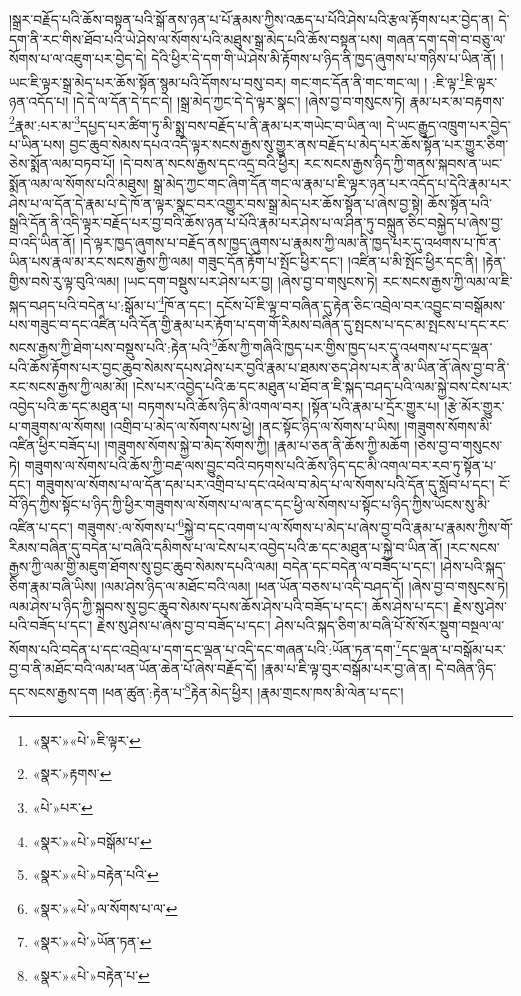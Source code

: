 །སྒྲར་བརྗོད་པའི་ཆོས་བསྟན་པའི་སྒོ་ནས་ཉན་པ་པོ་རྣམས་ཀྱིས་འཆད་པ་པོའི་ཤེས་པའི་རྩལ་རྟོགས་པར་བྱེད་ན། དེ་དག་ནི་རང་གིས་ཐོབ་པའི་ཡེ་ཤེས་ལ་སོགས་པའི་མཐུས་སྒྲ་མེད་པའི་ཆོས་བསྟན་པས། གཞན་དག་དགེ་བ་བཅུ་ལ་སོགས་པ་ལ་འཇུག་པར་བྱེད་དེ། དེའི་ཕྱིར་དེ་དག་གི་ཡེ་ཤེས་མི་རྟོགས་པ་ཉིད་ནི་ཁྱད་ཞུགས་པ་གཉིས་པ་ཡིན་ནོ། །ཡང་ཇི་ལྟར་སྒྲ་མེད་པར་ཆོས་སྟོན་སྙམ་པའི་དོགས་པ་བསུ་བར། གང་གང་དོན་ནི་གང་གང་ལ། །
:ཇི་ལྟ་\footnote{«སྣར་»«པེ་»ཇི་ལྟར་}ཇི་ལྟར་ཉན་འདོད་པ། །དེ་དེ་ལ་དོན་དེ་དང་དེ། །སྒྲ་མེད་ཀྱང་དེ་དེ་ལྟར་སྣང་། །ཞེས་བྱ་བ་གསུངས་ཏེ། རྣམ་པར་མ་བརྟགས་\footnote{«སྣར་»རྟགས་}རྣམ་:པར་མ་\footnote{«པེ་»པར་}དཔྱད་པར་ཚིག་ཏུ་མི་སྨྲ་བས་བརྗོད་པ་ནི་རྣམ་པར་གཡེང་བ་ཡིན་ལ། དེ་ཡང་རྒྱུད་འཁྲུག་པར་བྱེད་པ་ཡིན་པས། བྱང་ཆུབ་སེམས་དཔའ་འདི་ལྟར་སངས་རྒྱས་སུ་གྱུར་ནས་བརྗོད་པ་མེད་པར་ཆོས་སྟོན་པར་གྱུར་ཅིག་ཅེས་སྨོན་ལམ་བཏབ་པོ། །དེ་བས་ན་སངས་རྒྱས་དང་འདྲ་བའི་ཕྱིར། རང་སངས་རྒྱས་ཉིད་ཀྱི་གནས་སྐབས་ན་ཡང་སྨོན་ལམ་ལ་སོགས་པའི་མཐུས། སྒྲ་མེད་ཀྱང་གང་ཞིག་དོན་གང་ལ་རྣམ་པ་ཇི་ལྟར་ཉན་པར་འདོད་པ་དེའི་རྣམ་པར་ཤེས་པ་ལ་དོན་དེ་རྣམ་པ་དེ་ཁོ་ན་ལྟར་སྣང་བར་འགྱུར་བས་སྒྲ་མེད་པར་ཆོས་སྟོན་པ་ཞེས་བྱ་སྟེ། ཆོས་སྟོན་པའི་སྒྲའི་དོན་ནི་འདི་ལྟར་བརྗོད་པར་བྱ་བའི་ཆོས་ཉན་པ་པོའི་རྣམ་པར་ཤེས་པ་ལ་ཤིན་ཏུ་བསྐྲུན་ཅིང་བསྐྱེད་པ་ཞེས་བྱ་བ་འདི་ཡིན་ནོ། །དེ་ལྟར་ཁྱད་ཞུགས་པ་བརྗོད་ནས་ཁྱད་ཞུགས་པ་རྣམས་ཀྱི་ལམ་ནི་ཁྱད་པར་དུ་འཕགས་པ་ཁོ་ན་ཡིན་པས་རྣལ་མ་རང་སངས་རྒྱས་ཀྱི་ལམ། གཟུང་དོན་རྟོག་པ་སྤོང་ཕྱིར་དང་། །འཛིན་པ་མི་སྤོང་ཕྱིར་དང་ནི། །རྟེན་གྱིས་བསེ་རུ་ལྟ་བུའི་ལམ། །ཡང་དག་བསྡུས་པར་ཤེས་པར་བྱ། །ཞེས་བྱ་བ་གསུངས་ཏེ། རང་སངས་རྒྱས་ཀྱི་ལམ་ལ་ཇི་སྐད་བཤད་པའི་བདེན་པ་:སྒོམ་པ་\footnote{«སྣར་»«པེ་»བསྒོམ་པ་}ཁོ་ན་དང་། དངོས་པོ་ཇི་ལྟ་བ་བཞིན་དུ་རྟེན་ཅིང་འབྲེལ་བར་འབྱུང་བ་བསྒོམས་པས་གཟུང་བ་དང་འཛིན་པའི་དོན་གྱི་རྣམ་པར་རྟོག་པ་དག་གོ་རིམས་བཞིན་དུ་སྤངས་པ་དང་མ་སྤངས་པ་དང་རང་སངས་རྒྱས་ཀྱི་ཐེག་པས་བསྡུས་པའི་:རྟེན་པའི་\footnote{«སྣར་»«པེ་»བརྟེན་པའི་}ཆོས་ཀྱི་གཞིའི་ཁྱད་པར་གྱིས་ཁྱད་པར་དུ་འཕགས་པ་དང་ལྡན་པའི་ཆོས་རྟོགས་པར་བྱང་ཆུབ་སེམས་དཔས་ཤེས་པར་བྱའི་རྣམ་པ་ཐམས་ཅད་ཤེས་པར་ནི་མ་ཡིན་ནོ་ཞེས་བྱ་བ་ནི་རང་སངས་རྒྱས་ཀྱི་ལམ་མོ། །ངེས་པར་འབྱེད་པའི་ཆ་དང་མཐུན་པ་ཐོབ་ན་ཇི་སྐད་བཤད་པའི་ལམ་སྐྱེ་བས་ངེས་པར་འབྱེད་པའི་ཆ་དང་མཐུན་པ། བཏགས་པའི་ཆོས་ཉིད་མི་འགལ་བར། །སྟོན་པའི་རྣམ་པ་དྲོར་གྱུར་པ། །རྩེ་མོར་གྱུར་པ་གཟུགས་ལ་སོགས། །འགྲིབ་པ་མེད་ལ་སོགས་པས་ཕྱེ། །ནང་སྟོང་ཉིད་ལ་སོགས་པ་ཡིས། །གཟུགས་སོགས་མི་འཛིན་ཕྱིར་བཟོད་པ། །གཟུགས་སོགས་སྐྱེ་བ་མེད་སོགས་ཀྱི། །རྣམ་པ་ཅན་ནི་ཆོས་ཀྱི་མཆོག །ཅེས་བྱ་བ་གསུངས་ཏེ། གཟུགས་ལ་སོགས་པའི་ཆོས་ཀྱི་བརྡ་ལས་བྱུང་བའི་བཏགས་པའི་ཆོས་ཉིད་དང་མི་འགལ་བར་རབ་ཏུ་སྟོན་པ་དང་། གཟུགས་ལ་སོགས་པ་ལ་དོན་དམ་པར་འགྲིབ་པ་དང་འཕེལ་བ་མེད་པ་ལ་སོགས་པའི་དོན་དུ་སློབ་པ་དང་། ངོ་བོ་ཉིད་ཀྱིས་སྟོང་པ་ཉིད་ཀྱི་ཕྱིར་གཟུགས་ལ་སོགས་པ་ལ་ནང་དང་ཕྱི་ལ་སོགས་པ་སྟོང་པ་ཉིད་ཀྱིས་ཡོངས་སུ་མི་འཛིན་པ་དང་། གཟུགས་:ལ་སོགས་པ་\footnote{«སྣར་»«པེ་»ལ་སོགས་པ་ལ་}སྐྱེ་བ་དང་འགག་པ་ལ་སོགས་པ་མེད་པ་ཞེས་བྱ་བའི་རྣམ་པ་རྣམས་ཀྱིས་གོ་རིམས་བཞིན་དུ་བདེན་པ་བཞིའི་དམིགས་པ་ལ་ངེས་པར་འབྱེད་པའི་ཆ་དང་མཐུན་པ་སྐྱེ་བ་ཡིན་ནོ། །རང་སངས་རྒྱས་ཀྱི་ལམ་གྱི་མཇུག་ཐོགས་སུ་བྱང་ཆུབ་སེམས་དཔའི་ལམ། བདེན་དང་བདེན་ལ་བཟོད་པ་དང་། །ཤེས་པའི་སྐད་ཅིག་རྣམ་བཞི་ཡིས། །ལམ་ཤེས་ཉིད་ལ་མཐོང་བའི་ལམ། །ཕན་ཡོན་བཅས་པ་འདི་བཤད་དོ། །ཞེས་བྱ་བ་གསུངས་ཏེ། ལམ་ཤེས་པ་ཉིད་ཀྱི་སྐབས་སུ་བྱང་ཆུབ་སེམས་དཔས་ཆོས་ཤེས་པའི་བཟོད་པ་དང་། ཆོས་ཤེས་པ་དང་། རྗེས་སུ་ཤེས་པའི་བཟོད་པ་དང་། རྗེས་སུ་ཤེས་པ་ཞེས་བྱ་བ་བཟོད་པ་དང་། ཤེས་པའི་སྐད་ཅིག་མ་བཞི་པོ་སོ་སོར་སྡུག་བསྔལ་ལ་སོགས་པའི་བདེན་པ་དང་འབྲེལ་པ་དག་དང་ལྡན་པ་འདི་དང་གཞན་པའི་:ཡོན་ཏན་དག་\footnote{«སྣར་»«པེ་»ཡོན་ཏན་}དང་ལྡན་པ་བསྒོམ་པར་བྱ་བ་ནི་མཐོང་བའི་ལམ་ཕན་ཡོན་ཆེན་པོ་ཞེས་བརྗོད་དོ། །རྣམ་པ་ཇི་ལྟ་བུར་བསྒོམ་པར་བྱ་ཞེ་ན། དེ་བཞིན་ཉིད་དང་སངས་རྒྱས་དག །ཕན་ཚུན་:རྟེན་པ་\footnote{«སྣར་»«པེ་»བརྟེན་པ་}རྟེན་མེད་ཕྱིར། །རྣམ་གྲངས་ཁས་མི་ལེན་པ་དང་། 